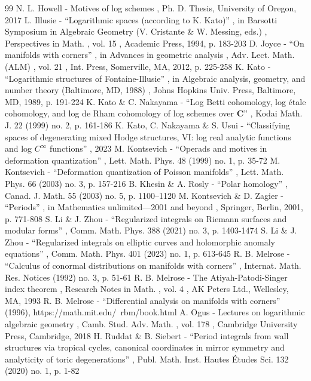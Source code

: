 \begin{thebibliography}{99}
 N. L. Howell - Motives of log schemes , Ph. D. Thesis, University of Oregon, 2017
 L. Illusie - “Logarithmic spaces (according to K. Kato)” , in Barsotti Symposium in Algebraic Geometry (V. Cristante \& W. Messing, eds.) , Perspectives in Math. , vol. 15 , Academic Press, 1994, p. 183-203
 D. Joyce - “On manifolds with corners” , in Advances in geometric analysis , Adv. Lect. Math. (ALM) , vol. 21 , Int. Press, Somerville, MA, 2012, p. 225-258
 K. Kato - “Logarithmic structures of Fontaine-Illusie” , in Algebraic analysis, geometry, and number theory (Baltimore, MD, 1988) , Johns Hopkins Univ. Press, Baltimore, MD, 1989, p. 191-224
 K. Kato \& C. Nakayama - “Log Betti cohomology, log étale cohomology, and log de Rham cohomology of log schemes over ${\mathbf{C}}$” , Kodai Math. J. 22 (1999) no. 2, p. 161-186
 K. Kato, C. Nakayama \& S. Usui - “Classifying spaces of degenerating mixed Hodge structures, VI: log real analytic functions and log ${C}^{\infty }$ functions” , 2023
 M. Kontsevich - “Operads and motives in deformation quantization” , Lett. Math. Phys. 48 (1999) no. 1, p. 35-72
 M. Kontsevich - “Deformation quantization of Poisson manifolds” , Lett. Math. Phys. 66 (2003) no. 3, p. 157-216
 B. Khesin \& A. Rosly - “Polar homology” , Canad. J. Math. 55 (2003) no. 5, p. 1100–1120
 M. Kontsevich \& D. Zagier - “Periods” , in Mathematics unlimited—2001 and beyond , Springer, Berlin, 2001, p. 771-808
 S. Li \& J. Zhou - “Regularized integrals on Riemann surfaces and modular forms” , Comm. Math. Phys. 388 (2021) no. 3, p. 1403-1474
 S. Li \& J. Zhou - “Regularized integrals on elliptic curves and holomorphic anomaly equations” , Comm. Math. Phys. 401 (2023) no. 1, p. 613-645
 R. B. Melrose - “Calculus of conormal distributions on manifolds with corners” , Internat. Math. Res. Notices (1992) no. 3, p. 51-61
 R. B. Melrose - The Atiyah-Patodi-Singer index theorem , Research Notes in Math. , vol. 4 , AK Peters Ltd., Wellesley, MA, 1993
 R. B. Melrose - “Differential analysis on manifolds with corners” (1996), https://math.mit.edu/~rbm/book.html
 A. Ogus - Lectures on logarithmic algebraic geometry , Camb. Stud. Adv. Math. , vol. 178 , Cambridge University Press, Cambridge, 2018
 H. Ruddat \& B. Siebert - “Period integrals from wall structures via tropical cycles, canonical coordinates in mirror symmetry and analyticity of toric degenerations” , Publ. Math. Inst. Hautes Études Sci. 132 (2020) no. 1, p. 1-82

\end{thebibliography}
